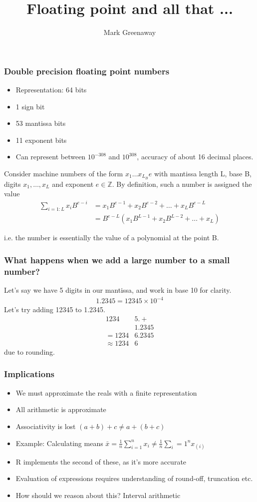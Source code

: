 \documentclass{beamer}
\title{Floating point and all that ...}
\author{Mark Greenaway}
\begin{document}
\begin{frame}
\frametitle{Double precision floating point numbers}
\begin{itemize}
\item Representation: 64 bits
\item 1 sign bit
\item 53 mantissa bits
\item 11 exponent bits

\item Can represent between $10^{-308}$ and $10^{308}$, accuracy of about 16 decimal places.
\end{itemize}
\end{frame}

\begin{frame}
Consider machine numbers of the form $x_1 \ldots x_{L_B} e$ with mantissa length L, base B, digits $x_1, \ldots, x_L$ and exponent $e \in \mathbb{Z}$. 
By definition, such a number is assigned the value
\begin{align*}
\sum_{i=1:L} x_i B^{e-i} &= x_1 B^{e-1} + x_2 B^{e-2} + \ldots + x_L B^{e-L} \\
&= B^{e-L}(x_1 B^{L-1} + x_2 B^{L-2} + \ldots + x_L)
\end{align*}

i.e. the number is essentially the value of a polynomial at the point B.

\end{frame}

\begin{frame}
\frametitle{What happens when we add a large number to a small number?}
Let's say we have 5 digits in our mantissa, and work in base 10 for clarity.
\begin{align*}
1.2345 = 12345 \times 10^{-4}
\end{align*}
Let's try adding 12345 to 1.2345.
\begin{align*}
1234&5. +\\
&1.2345\\
=1234&6.2345 \\
\approx 1234&6
\end{align*}
due to rounding.
\end{frame}

\begin{frame}
\frametitle{Implications}
\begin{itemize}
\item We must approximate the reals with a finite representation
\item All arithmetic is approximate
\item Associativity is lost $(a + b) + c \ne a + (b + c)$
\item Example: Calculating means $\bar{x} = \frac{1}{n} \sum_{i=1}^n x_i \ne \frac{1}{n} \sum_i=1^n x_{(i)}$
\item R implements the second of these, as it's more accurate
\item Evaluation of expressions requires understanding of round-off, truncation etc.
\item How should we reason about this? Interval arithmetic
\end{itemize}
\end{frame}
\end{document}
